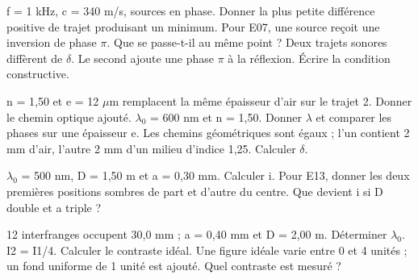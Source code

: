 f = 1 kHz, c = 340 m/s, sources en phase. Donner la plus petite différence positive de trajet produisant un minimum.
Pour E07, une source reçoit une inversion de phase \ensuremath{\pi}. Que se passe-t-il au même point ?
Deux trajets sonores diffèrent de \ensuremath{\delta}. Le second ajoute une phase \ensuremath{\pi} à la réflexion. Écrire la condition constructive.


n = 1,50 et e = 12 \ensuremath{\mu}m remplacent la même épaisseur d’air sur le trajet 2. Donner le chemin optique ajouté.
\ensuremath{\lambda_0} = 600 nm et n = 1,50. Donner \ensuremath{\lambda} et comparer les phases sur une épaisseur e.
Les chemins géométriques sont égaux ; l’un contient 2 mm d’air, l’autre 2 mm d’un milieu d’indice 1,25. Calculer \ensuremath{\delta}.


\ensuremath{\lambda_0} = 500 nm, D = 1,50 m et a = 0,30 mm. Calculer i.
Pour E13, donner les deux premières positions sombres de part et d’autre du centre.
Que devient i si D double et a triple ?


12 interfranges occupent 30,0 mm ; a = 0,40 mm et D = 2,00 m. Déterminer \ensuremath{\lambda_0}.
I2 = I1/4. Calculer le contraste idéal.
Une figure idéale varie entre 0 et 4 unités ; un fond uniforme de 1 unité est ajouté. Quel contraste est mesuré ?


